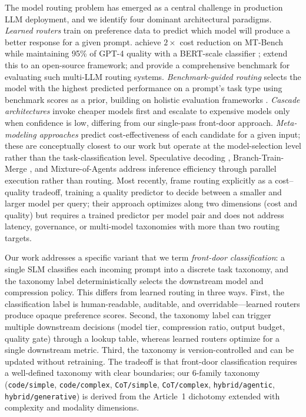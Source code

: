 \documentclass{article}
\begin{document}
The model routing problem has emerged as a central challenge in production LLM deployment, and we identify four dominant architectural paradigms. \emph{Learned routers} train on preference data to predict which model will produce a better response for a given prompt. \citet{jiang2023routellm} achieve $2\times$ cost reduction on MT-Bench while maintaining 95\% of GPT-4 quality with a BERT-scale classifier \citep{devlin2019bert}; \citet{ong2025routellm} extend this to an open-source framework; and \citet{hu2024routerbench} provide a comprehensive benchmark for evaluating such multi-LLM routing systems. \emph{Benchmark-guided routing} \citep{shnitzer2023large} selects the model with the highest predicted performance on a prompt's task type using benchmark scores as a prior, building on holistic evaluation frameworks \citep{liang2023helm,srivastava2023beyond}. \emph{Cascade architectures} \citep{chen2023frugalgpt,madaan2023automix,yue2024cascades,lu2023routing} invoke cheaper models first and escalate to expensive models only when confidence is low, differing from our single-pass front-door approach. \emph{Meta-modeling approaches} \citep{sakota2024flyswat,zhang2024onthefly} predict cost-effectiveness of each candidate for a given input; these are conceptually closest to our work but operate at the model-selection level rather than the task-classification level. Speculative decoding \citep{leviathan2023speculative,chen2023speculative}, Branch-Train-Merge \citep{li2022branchtrain}, and Mixture-of-Agents \citep{wang2024moa} address inference efficiency through parallel execution rather than routing. Most recently, \citet{ding2024hybrid} frame routing explicitly as a cost--quality tradeoff, training a quality predictor to decide between a smaller and larger model per query; their approach optimizes along two dimensions (cost and quality) but requires a trained predictor per model pair and does not address latency, governance, or multi-model taxonomies with more than two routing targets.

Our work addresses a specific variant that we term \emph{front-door classification}: a single SLM classifies each incoming prompt into a discrete task taxonomy, and the taxonomy label deterministically selects the downstream model and compression policy. This differs from learned routing in three ways. First, the classification label is human-readable, auditable, and overridable---learned routers produce opaque preference scores. Second, the taxonomy label can trigger multiple downstream decisions (model tier, compression ratio, output budget, quality gate) through a lookup table, whereas learned routers optimize for a single downstream metric. Third, the taxonomy is version-controlled and can be updated without retraining. The tradeoff is that front-door classification requires a well-defined taxonomy with clear boundaries; our 6-family taxonomy (\texttt{code/simple}, \texttt{code/complex}, \texttt{CoT/simple}, \texttt{CoT/complex}, \texttt{hybrid/agentic}, \texttt{hybrid/generative}) is derived from the Article~1 dichotomy extended with complexity and modality dimensions.
\end{document}
